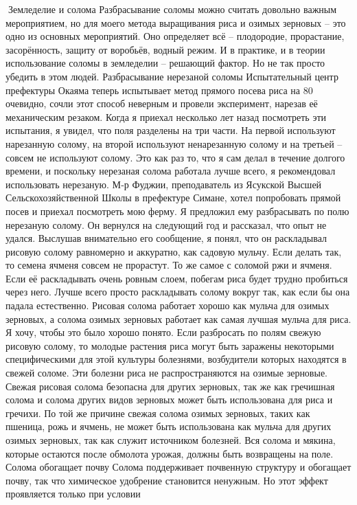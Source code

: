 \documentclass[a4paper]{book}
\begin{document}
Земледелие и солома
Разбрасывание соломы можно считать довольно важным мероприятием, но для моего
метода выращивания риса и озимых зерновых – это одно из основных мероприятий. Оно
определяет всё – плодородие, прорастание, засорённость, защиту от воробьёв, водный
режим. И в практике, и в теории использование соломы в земледелии – решающий фактор.
Но не так просто убедить в этом людей.
Разбрасывание нерезаной соломы
Испытательный центр префектуры Окаяма теперь испытывает метод прямого посева
риса на 80 %
очевидно, сочли этот способ неверным и провели эксперимент, нарезав её механическим
резаком. Когда я приехал несколько лет назад посмотреть эти испытания, я увидел, что поля
разделены на три части. На первой используют нарезанную солому, на второй используют
ненарезанную солому и на третьей – совсем не используют солому. Это как раз то, что я сам
делал в течение долгого времени, и поскольку нерезаная солома работала лучше всего, я
рекомендовал использовать нерезаную.
М‑р Фуджии, преподаватель из Ясукской Высшей Сельскохозяйственной Школы в
префектуре Симане, хотел попробовать прямой посев и приехал посмотреть мою ферму. Я
предложил ему разбрасывать по полю нерезаную солому. Он вернулся на следующий год и
рассказал, что опыт не удался. Выслушав внимательно его сообщение, я понял, что он
раскладывал рисовую солому равномерно и аккуратно, как садовую мульчу. Если делать так,
то семена ячменя совсем не прорастут. То же самое с соломой ржи и ячменя. Если её
раскладывать очень ровным слоем, побегам риса будет трудно пробиться через него. Лучше
всего просто раскладывать солому вокруг так, как если бы она падала естественно.
Рисовая солома работает хорошо как мульча для озимых зерновых, а солома озимых
зерновых работает как самая лучшая мульча для риса. Я хочу, чтобы это было хорошо понято.
Если разбросать по полям свежую рисовую солому, то молодые растения риса могут быть
заражены некоторыми специфическими для этой культуры болезнями, возбудители которых
находятся в свежей соломе. Эти болезни риса не распространяются на озимые зерновые.
Свежая рисовая солома безопасна для других зерновых, так же как гречишная солома и
солома других видов зерновых может быть использована для риса и гречихи. По той же
причине свежая солома озимых зерновых, таких как пшеница, рожь и ячмень, не может быть
использована как мульча для других озимых зерновых, так как служит источником болезней.
Вся солома и мякина, которые остаются после обмолота урожая, должны быть
возвращены на поле.
Солома обогащает почву
Солома поддерживает почвенную структуру и обогащает почву, так что химическое
удобрение становится ненужным. Но этот эффект проявляется только при условии
\end{document}
